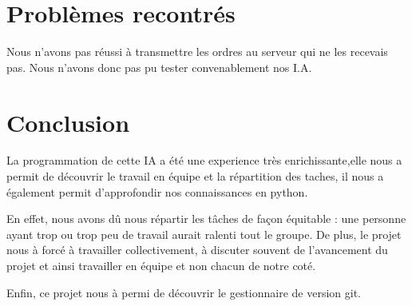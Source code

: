 \documentclass{rapport}
\begin{document}
	\chapter{Problèmes recontrés}
		Nous n'avons pas réussi à transmettre les ordres au serveur qui ne les recevais pas. Nous n'avons donc pas pu tester convenablement nos I.A.
	\chapter*{Conclusion}
La programmation de cette IA a été une experience très enrichissante,elle nous a permit de découvrir le travail en équipe et la répartition des taches, 
il nous a également permit d'approfondir nos connaissances en python.

En effet, nous avons dû nous répartir les tâches de façon équitable : une personne ayant trop ou trop peu de travail aurait ralenti tout le groupe.
De plus, le projet nous à forcé à travailler collectivement, à discuter souvent de l'avancement du projet et ainsi travailler en équipe et non chacun 
de notre coté.

Enfin, ce projet nous à permi de découvrir le gestionnaire de version git.
	\printindex
\end{document}
